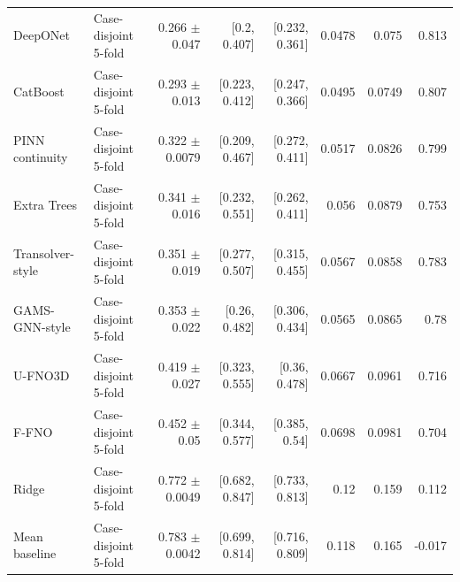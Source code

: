\begin{landscape}
\begin{longtable}{p{3.8cm}p{2.9cm}rrrrrr}
DeepONet & Case-disjoint 5-fold & 0.266 $\pm$ 0.047 & [0.2, 0.407] & [0.232, 0.361] & 0.0478 & 0.075 & 0.813 \\
CatBoost & Case-disjoint 5-fold & 0.293 $\pm$ 0.013 & [0.223, 0.412] & [0.247, 0.366] & 0.0495 & 0.0749 & 0.807 \\
PINN continuity & Case-disjoint 5-fold & 0.322 $\pm$ 0.0079 & [0.209, 0.467] & [0.272, 0.411] & 0.0517 & 0.0826 & 0.799 \\
Extra Trees & Case-disjoint 5-fold & 0.341 $\pm$ 0.016 & [0.232, 0.551] & [0.262, 0.411] & 0.056 & 0.0879 & 0.753 \\
Transolver-style & Case-disjoint 5-fold & 0.351 $\pm$ 0.019 & [0.277, 0.507] & [0.315, 0.455] & 0.0567 & 0.0858 & 0.783 \\
GAMS-GNN-style & Case-disjoint 5-fold & 0.353 $\pm$ 0.022 & [0.26, 0.482] & [0.306, 0.434] & 0.0565 & 0.0865 & 0.78 \\
U-FNO3D & Case-disjoint 5-fold & 0.419 $\pm$ 0.027 & [0.323, 0.555] & [0.36, 0.478] & 0.0667 & 0.0961 & 0.716 \\
F-FNO & Case-disjoint 5-fold & 0.452 $\pm$ 0.05 & [0.344, 0.577] & [0.385, 0.54] & 0.0698 & 0.0981 & 0.704 \\
Ridge & Case-disjoint 5-fold & 0.772 $\pm$ 0.0049 & [0.682, 0.847] & [0.733, 0.813] & 0.12 & 0.159 & 0.112 \\
Mean baseline & Case-disjoint 5-fold & 0.783 $\pm$ 0.0042 & [0.699, 0.814] & [0.716, 0.809] & 0.118 & 0.165 & -0.017 \\
\bottomrule\end{longtable}\end{landscape}

